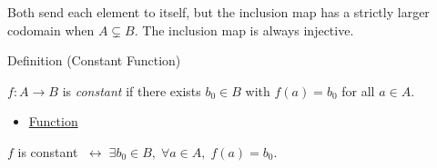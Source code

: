 \begin{remark*}
\label{def:inclusion}
Both send each element to itself, but the inclusion map has a strictly larger
codomain when $A \subsetneq B$. The inclusion map is always injective.
\end{remark*}

\begin{definitionbox}{Definition (Constant Function)}
\begin{definition}\label{def:constant}
$f : A \to B$ is \emph{constant} if there exists $b_0 \in B$ with
$f(a) = b_0$ for all $a \in A$.
\end{definition}
\end{definitionbox}

\begin{dependencies}
\begin{itemize}
  \item \hyperref[def:function]{Function}
\end{itemize}
\end{dependencies}

\begin{remark*}
$f$ is constant $\;\leftrightarrow\; \exists b_0 \in B,\; \forall a \in A,\; f(a) = b_0$.
\end{remark*}
